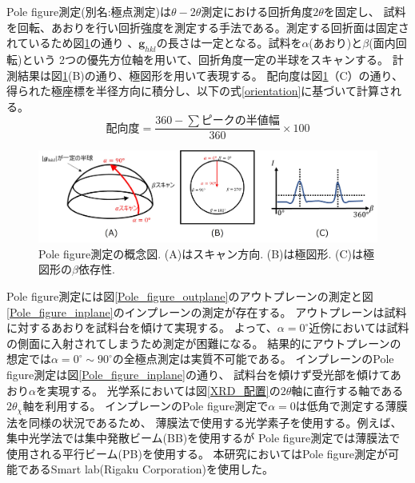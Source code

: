 \documentclass[dvipdfmx,12pt,a4paper]{jreport}
\begin{document}
			Pole figure測定(別名:極点測定)は$\theta-2\theta$測定における回折角度$2\theta$を固定し、
			試料を回転、あおりを行い回折強度を測定する手法である。測定する回折面は固定されているため図\ref{極点の測定方法}の通り
			、$\bm{g}_{hkl}$の長さは一定となる。試料を$\alpha$(あおり)と$\beta$(面内回転)という
			2つの優先方位軸を用いて、回折角度一定の半球をスキャンする。
			計測結果は図\ref{極点の測定方法}(B)の通り、極図形を用いて表現する。
			配向度は図\ref{極点の測定方法}（C）の通り、得られた極座標を半径方向に積分し、以下の式\ref{orientation}に基づいて計算される。
			\begin{equation}
				配向度 = \frac{360 - \sum ピークの半値幅 }{360}\times 100
				\label{orientation}
			\end{equation}
			\begin{figure}[h]
				\centering
				\includegraphics[width=\linewidth]{極点の測定方法.jpg}
				\caption{Pole figure測定の概念図. (A)はスキャン方向. (B)は極図形. (C)は極図形の$\beta$依存性.}
				\label{極点の測定方法}
			\end{figure}
			\newpage
			Pole figure測定には図\ref{Pole_figure_outplane}のアウトプレーンの測定と図\ref{Pole_figure_inplane}のインプレーンの測定が存在する。
			アウトプレーンは試料に対するあおりを試料台を傾けて実現する。
			よって、$\alpha=0^{\circ}$近傍においては試料の側面に入射されてしまうため測定が困難になる。
			結果的にアウトプレーンの想定では$\alpha=0^{\circ}\sim90^{\circ}$の全極点測定は実質不可能である。
			インプレーンのPole figure測定は図\ref{Pole_figure_inplane}の通り、
			試料台を傾けず受光部を傾けてあおり$\alpha$を実現する。
			光学系においては図\ref{XRD_配置}の$2\theta$軸に直行する軸である$2\theta_\chi$軸を利用する。
			インプレーンのPole figure測定で$\alpha=0$は低角で測定する薄膜法を同様の状況であるため、
			薄膜法で使用する光学素子を使用する。例えば、集中光学法では集中発散ビーム(BB)を使用するが
			Pole figure測定では薄膜法で使用される平行ビーム(PB)を使用する。
			本研究においてはPole figure測定が可能であるSmart lab(Rigaku Corporation)を使用した。
			
\end{document}
